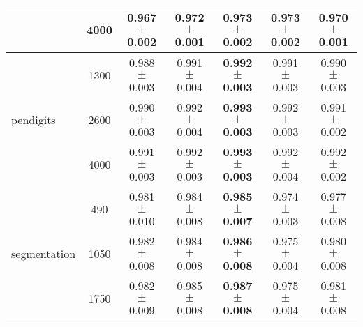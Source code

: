 \documentclass{standalone}
\begin{document}
\begin{table*}
\begin{small}
\begin{sc}
{\begin{tabular}{|l|c|c|c|c|c|c|}
	& 4000			& 0.967 $\pm$ 0.002 & 0.972 $\pm$ 0.001 			& 0.973 $\pm$ 0.002 	& \textbf{0.973 $\pm$ 0.002} & 0.970 $\pm$ 0.001\\
\hline
\multirow{3}{*}{pendigits}
	& 1300			& 0.988 $\pm$ 0.003 & 0.991 $\pm$ 0.004 & \textbf{0.992 $\pm$ 0.003} & 0.991 $\pm$ 0.003 & 0.990 $\pm$ 0.003 \\
	& 2600			& 0.990 $\pm$ 0.003 & 0.992 $\pm$ 0.004 & \textbf{0.993 $\pm$ 0.003} & 0.992 $\pm$ 0.003 & 0.991 $\pm$ 0.002 \\
	& 4000			& 0.991 $\pm$ 0.003 & 0.992 $\pm$ 0.003 & \textbf{0.993 $\pm$ 0.003} & 0.992 $\pm$ 0.004 & 0.992 $\pm$ 0.002 \\
\hline
\multirow{3}{*}{segmentation}
	& 490			& 	0.981 $\pm$ 0.010 & 0.984 $\pm$ 0.008 & \textbf{0.985 $\pm$ 0.007} & 0.974 $\pm$ 0.003 & 0.977 $\pm$ 0.008 \\
	& 1050			& 	0.982 $\pm$ 0.008 & 0.984 $\pm$ 0.008 & \textbf{0.986 $\pm$ 0.008} & 0.975 $\pm$ 0.004 & 0.980 $\pm$ 0.008 \\
	& 1750			& 	0.982 $\pm$ 0.009 & 0.985 $\pm$ 0.008 & \textbf{0.987 $\pm$ 0.008} & 0.975 $\pm$ 0.004 & 0.981 $\pm$ 0.008 \\
\hline
\end{tabular}
\vskip -0.1in
} %
\end{sc}
\end{small}
\end{table*}
	
\end{document}
